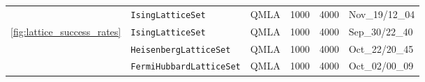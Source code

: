 \begin{tabular}{lllrrl}
                                 & \texttt{IsingLatticeSet} &                                     QMLA &                                     1000 &                                     4000 &                           Nov\_19/12\_04 \\
\cline{1-6}
\multirow{3}{*}{\cref{fig:lattice_success_rates}} & \texttt{IsingLatticeSet} &                                     QMLA &                                     1000 &                                     4000 &                           Sep\_30/22\_40 \\
                                 & \texttt{HeisenbergLatticeSet} &                                     QMLA &                                     1000 &                                     4000 &                           Oct\_22/20\_45 \\
                                 & \texttt{FermiHubbardLatticeSet} &                                     QMLA &                                     1000 &                                     4000 &                           Oct\_02/00\_09 \\
\hline
\end{tabular}
